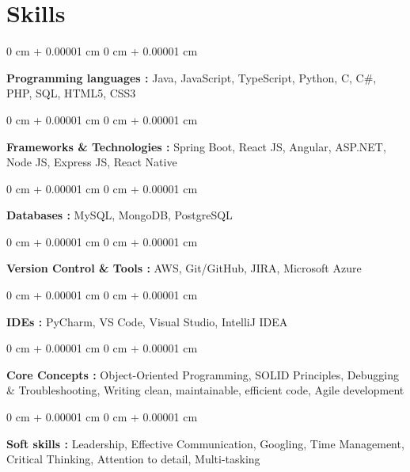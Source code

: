 \documentclass[10pt, letterpaper]{article}
\newenvironment{onecolentry}{
    \begin{adjustwidth}{
        0 cm + 0.00001 cm
    }{
        0 cm + 0.00001 cm
    }
}{
    \end{adjustwidth}
} %
\begin{document}
    \section{Skills}

        \begin{onecolentry}
            \textbf{Programming languages :} Java, JavaScript, TypeScript, Python, C, C\#, PHP, SQL, HTML5, CSS3
        \end{onecolentry}

        \vspace{0.1 cm}

        \begin{onecolentry}
            \textbf{Frameworks \& Technologies :} Spring Boot, React JS, Angular, ASP.NET, Node JS, Express JS, React Native 
        \end{onecolentry}

        \vspace{0.1 cm}

        \begin{onecolentry}
            \textbf{Databases :} MySQL, MongoDB, PostgreSQL
        \end{onecolentry}

        \vspace{0.1 cm}

        \begin{onecolentry}
            \textbf{Version Control \& Tools :} AWS, Git/GitHub, JIRA, Microsoft Azure
        \end{onecolentry}

        \vspace{0.1 cm}

        \begin{onecolentry}
            \textbf{IDEs :} PyCharm, VS Code, Visual Studio, IntelliJ IDEA
        \end{onecolentry}

        \vspace{0.1 cm}

        \begin{onecolentry}
            \textbf{Core Concepts :} Object-Oriented Programming, SOLID Principles, Debugging \& Troubleshooting, Writing clean, maintainable, efficient code, Agile development
        \end{onecolentry}

        \vspace{0.1 cm}

        \begin{onecolentry}
            \textbf{Soft skills :} Leadership, Effective Communication, Googling, Time Management, Critical Thinking, Attention to detail, Multi-tasking
        \end{onecolentry}
\end{document}
